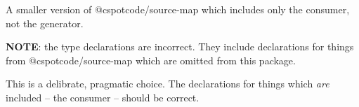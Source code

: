A smaller version of @cspotcode/source-\/map which includes only the consumer, not the generator.

{\bfseries{NOTE}}\+: the type declarations are incorrect. They include declarations for things from @cspotcode/source-\/map which are omitted from this package.

This is a delibrate, pragmatic choice. The declarations for things which {\itshape are} included -- the consumer -- should be correct. 